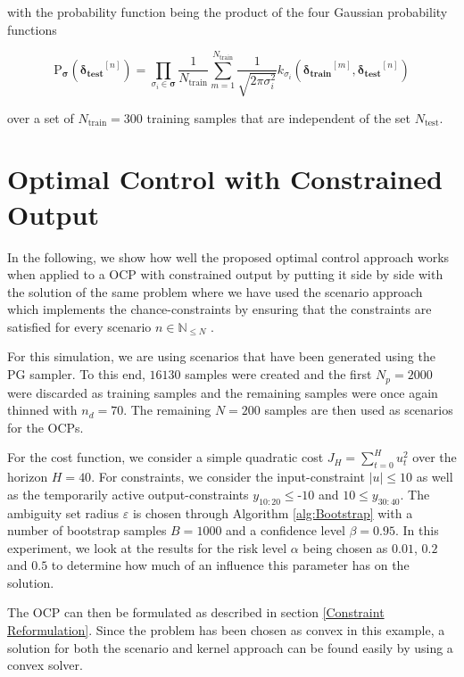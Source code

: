 with the probability function being the product of the four Gaussian probability functions 

 \begin{equation} \label{Gaussian Probability}
\text{P}_{\boldsymbol{\sigma}} ( \boldsymbol{\delta_\text{test}}^{[n]} ) = \prod_{\sigma_i \in \boldsymbol{\sigma}} \frac{1}{N_\text{train}} \sum_{m = 1}^{N_\text{train}} \frac{1}{\sqrt{2 \pi \sigma_i^2}} k_{\sigma_i}(\boldsymbol{\delta_\text{train}}^{[m]} ,\boldsymbol{\delta_\text{test}}^{[n]})
\end{equation}

over a set of $N_\text{train} = 300$ training samples that are independent of the set $N_\text{test}$.


\section{Optimal Control with Constrained Output} \label{optimal control}

In the following, we show how well the proposed optimal control approach works when applied to a OCP with constrained output by putting it side by side with the solution of the same problem where we have used the scenario approach which implements the chance-constraints by ensuring that the constraints are satisfied for every scenario $n \in \mathbb{N}_{\leq N}$ \cite{Garatti_22}. 

For this simulation, we are using scenarios that have been generated using the PG sampler. To this end, $16130$ samples were created and the first $N_p = 2000$ were discarded as training samples and the remaining samples were once again thinned with $n_d = 70$. The remaining $N = 200$ samples are then used as scenarios for the OCPs.

For the cost function, we consider a simple quadratic cost $J_H = \sum_{t = 0}^H u_t^2$ over the horizon $H = 40$. For constraints, we consider the input-constraint $\left| u \right| \leq 10$ as well as the temporarily active output-constraints $y_{10:20} \leq \text{-} 10$ and $10 \leq y_{30:40}$.  The ambiguity set radius $\varepsilon$ is chosen through Algorithm \ref{alg:Bootstrap} with a number of bootstrap samples $B = 1000$ and a confidence level $\beta = 0.95$. In this experiment, we look at the results for the risk level $\alpha$ being chosen as $0.01$, $0.2$ and $0.5$ to determine how much of an influence this parameter has on the solution.

The OCP can then be formulated as described in section \ref{Constraint Reformulation}. Since the problem has been chosen as convex in this example, a solution for both the scenario and kernel approach can be found easily by using a convex solver.

